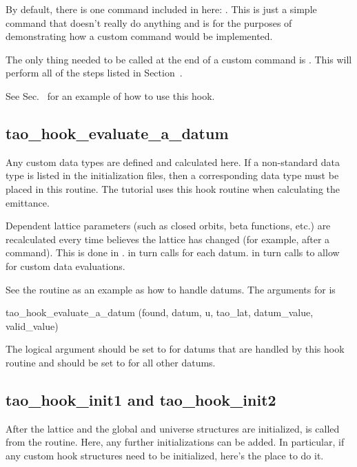 {By default, there is one command included in here: . This
is just a simple command that doesn't really do anything and is for
the purposes of demonstrating how a custom command would be
implemented.

The only thing needed to be called at the end of a custom command is
. This will perform all of the steps listed in
Section~.

See Sec.~ for an example of how to use this hook.

\subsection{tao_hook_evaluate_a_datum}

Any custom data types are defined and calculated here. If a non-standard data type is listed in the
initialization files, then a corresponding data type must be placed in this routine. The tutorial
uses this hook routine when calculating the emittance.

Dependent lattice parameters (such as closed orbits, beta functions, etc.) are recalculated every
time \tao believes the lattice has changed (for example, after a  command).  This is done
in .  in turn calls  for each
datum.  in turn calls  to allow for custom
data evaluations. 

See the  routine as an example as how to handle datums.
The arguments for  is
\begin{example}
  tao_hook_evaluate_a_datum (found, datum, u, tao_lat, datum_value, valid_value)
\end{example}
The  logical argument should be set to  for datums that are handled by this
hook routine and  should be set to  for all other datums.

\subsection{tao_hook_init1 and tao_hook_init2}
\label{s:hook.init}

After the  lattice and the global and universe structures are initialized,
 is called from the  routine. Here, any further
initializations can be added. In particular, if any custom hook structures need to be
initialized, here's the place to do it. 

}
